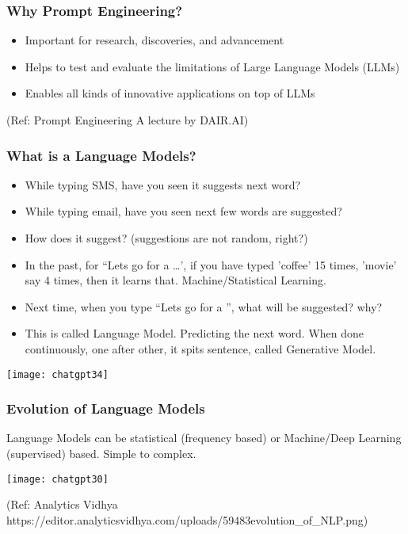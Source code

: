 \begin{frame}[fragile]\frametitle{Why Prompt Engineering?}

\begin{itemize}
\item Important for research, discoveries, and advancement
\item Helps to test and evaluate the limitations of Large Language Models (LLMs)
\item Enables all kinds of innovative  applications on top of LLMs
\end{itemize}	

{\tiny (Ref: Prompt Engineering A lecture by DAIR.AI)}
\end{frame}



\begin{frame}[fragile]\frametitle{What is a Language Models?}

\begin{itemize}
\item While typing SMS, have you seen it suggests next word?
\item While typing email, have you seen next few words are suggested?
\item How does it suggest? (suggestions are not random, right?)
\item In the past, for ``Lets go for a \ldots', if you have typed 'coffee' 15 times, 'movie' say 4 times, then it learns that. Machine/Statistical Learning.
\item Next time, when you type ``Lets go for a '', what will be suggested? why?
\item This is called Language Model. Predicting the next word. When done continuously, one after other, it spits sentence, called Generative Model.
\end{itemize}	

\begin{center}
\texttt{[image: chatgpt34]}
\end{center}		

\end{frame}

\begin{frame}[fragile]\frametitle{Evolution of Language Models}

Language Models can be statistical (frequency based) or Machine/Deep Learning (supervised) based. Simple to complex.

\begin{center}
\texttt{[image: chatgpt30]}
\end{center}				
{\tiny (Ref: Analytics Vidhya https://editor.analyticsvidhya.com/uploads/59483evolution\_of\_NLP.png)}

\end{frame}

